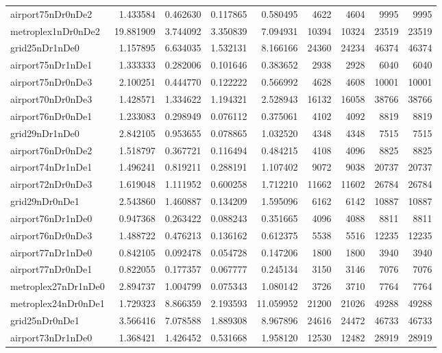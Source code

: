 \begin{longtable}{|l|r|r|r|r|r|r|r|r|}
airport75nDr0nDe2 & 1.433584 & 0.462630 & 0.117865 & 0.580495 & 4622 & 4604 & 9995 & 9995 \\
metroplex1nDr0nDe2 & 19.881909 & 3.744092 & 3.350839 & 7.094931 & 10394 & 10324 & 23519 & 23519 \\
grid25nDr1nDe0 & 1.157895 & 6.634035 & 1.532131 & 8.166166 & 24360 & 24234 & 46374 & 46374 \\
airport75nDr1nDe1 & 1.333333 & 0.282006 & 0.101646 & 0.383652 & 2938 & 2928 & 6040 & 6040 \\
airport75nDr0nDe3 & 2.100251 & 0.444770 & 0.122222 & 0.566992 & 4628 & 4608 & 10001 & 10001 \\
airport70nDr0nDe3 & 1.428571 & 1.334622 & 1.194321 & 2.528943 & 16132 & 16058 & 38766 & 38766 \\
airport76nDr0nDe1 & 1.233083 & 0.298949 & 0.076112 & 0.375061 & 4102 & 4092 & 8819 & 8819 \\
grid29nDr1nDe0 & 2.842105 & 0.953655 & 0.078865 & 1.032520 & 4348 & 4348 & 7515 & 7515 \\
airport76nDr0nDe2 & 1.518797 & 0.367721 & 0.116494 & 0.484215 & 4108 & 4096 & 8825 & 8825 \\
airport74nDr1nDe1 & 1.496241 & 0.819211 & 0.288191 & 1.107402 & 9072 & 9038 & 20737 & 20737 \\
airport72nDr0nDe3 & 1.619048 & 1.111952 & 0.600258 & 1.712210 & 11662 & 11602 & 26784 & 26784 \\
grid29nDr0nDe1 & 2.543860 & 1.460887 & 0.134209 & 1.595096 & 6162 & 6142 & 10887 & 10887 \\
airport76nDr1nDe0 & 0.947368 & 0.263422 & 0.088243 & 0.351665 & 4096 & 4088 & 8811 & 8811 \\
airport76nDr0nDe3 & 1.488722 & 0.476213 & 0.136162 & 0.612375 & 5538 & 5516 & 12235 & 12235 \\
airport77nDr1nDe0 & 0.842105 & 0.092478 & 0.054728 & 0.147206 & 1800 & 1800 & 3940 & 3940 \\
airport77nDr0nDe1 & 0.822055 & 0.177357 & 0.067777 & 0.245134 & 3150 & 3146 & 7076 & 7076 \\
metroplex27nDr1nDe0 & 2.894737 & 1.004799 & 0.075343 & 1.080142 & 3726 & 3710 & 7764 & 7764 \\
metroplex24nDr0nDe1 & 1.729323 & 8.866359 & 2.193593 & 11.059952 & 21200 & 21026 & 49288 & 49288 \\
grid25nDr0nDe1 & 3.566416 & 7.078588 & 1.889308 & 8.967896 & 24616 & 24472 & 46733 & 46733 \\
airport73nDr1nDe0 & 1.368421 & 1.426452 & 0.531668 & 1.958120 & 12530 & 12482 & 28919 & 28919 \\

\end{longtable}
